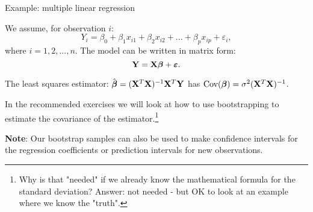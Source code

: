 \documentclass[10pt,ignorenonframetext,]{beamer}
\begin{document}
\begin{frame}

\begin{block}{Example: multiple linear regression}

We assume, for observation \(i\):
\[Y_i= \beta_0 + \beta_{1}  x_{i1} + \beta_2 x_{i2} + ... + \beta_p x_{ip} + \varepsilon_i,\]
where \(i=1,2,...,n\). The model can be written in matrix form:
\[{\bf Y}={\bf X} \boldsymbol{\beta}+{\boldsymbol{\varepsilon}}.\]

The least squares estimator:
\(\hat{\boldsymbol\beta}=({\bf X}^T{\bf X})^{-1} {\bf X}^T {\bf Y}\) has
\(\text{Cov}(\boldsymbol\beta)=\sigma^2({\bf X}^T{\bf X})^{-1}\).

In the recommended exercises we will look at how to use bootstrapping to
estimate the covariance of the estimator.\footnote{
Why is that "needed" if we already know the mathematical formula for the standard deviation? Answer: not needed - but OK to look at an example where we know the "truth".}

\vspace{2mm}
\normalsize

\textbf{Note}: Our bootstrap samples can also be used to make confidence
intervals for the regression coefficients or prediction intervals for
new observations.

\end{block}

\end{frame}
\end{document}
